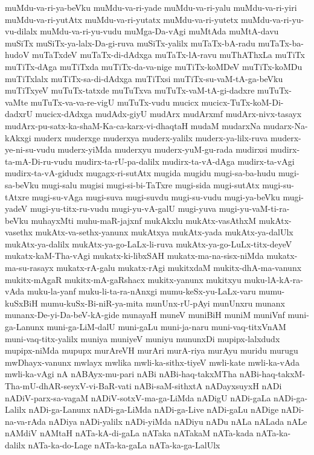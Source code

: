 {muMdu-va-ri-ya-beVku
muMdu-va-ri-yade
muMdu-va-ri-yalu
muMdu-va-ri-yiri
muMdu-va-ri-yutAtx
muMdu-va-ri-yutatx
muMdu-va-ri-yutetx
muMdu-va-ri-yu-vu-dilalx
muMdu-va-ri-yu-vudu
muMga-Da-vAgi
muMtAda
muMtA-davu
muSiTx
muSiTx-ya-lalx-Da-gi-ruva
muSiTx-yalilx
muTaTx-bA-radu
muTaTx-ba-hudoV
muTaTxdeV
muTaTx-di-dAdxga
muTaTx-lA-ravu
muThAThxLa
muTiTx
muTiTx-dAga
muTiTxda
muTiTx-da-va-nige
muTiTx-koMDeV
muTiTx-koMDu
muTiTxlalx
muTiTx-sa-di-dAdxga
muTiTxsi
muTiTx-su-vaM-tA-ga-beVku
muTiTxyeV
muTuTx-tatxde
muTuTxva
muTuTx-vaM-tA-gi-dadxre
muTuTx-vaMte
muTuTx-va-va-re-vigU
muTuTx-vudu
mucicx
mucicx-TuTx-koM-Di-dadxrU
mucicx-dAdxga
mudAdx-giyU
mudArx
mudArxmf
mudArx-nivx-tasayx
mudArx-pu-satx-ka-shaM-Ka-ca-karx-vi-dhaqtaH
mudaM
mudarxNa
mudarx-Na-kAkxgi
muderx
muderxge
muderxya
muderx-yalilx
muderx-ya-lilx-ruva
muderx-ye-ni-su-vudu
muderx-yiMda
muderxyu
muderx-yuM-gu-rada
mudirxsi
mudirx-ta-mA-Di-ru-vudu
mudirx-ta-rU-pa-dalilx
mudirx-ta-vA-dAga
mudirx-ta-vAgi
mudirx-ta-vA-gidudx
mugagx-ri-sutAtx
mugida
mugidu
mugi-sa-ba-hudu
mugi-sa-beVku
mugi-salu
mugisi
mugi-si-bi-TaTxre
mugi-sida
mugi-sutAtx
mugi-su-tAtxre
mugi-su-vAga
mugi-suva
mugi-suvdu
mugi-su-vudu
mugi-ya-beVku
mugi-yadeV
mugi-yu-titx-ru-vudu
mugi-yu-vA-galU
mugi-yuva
mugi-yu-vaM-ti-ra-beVku
muhayxMti
muhu-maR-jajxnf
mukAkxlu
mukAtx-vasAthxM
mukAtx-vasethx
mukAtx-va-sethx-yanunx
mukAtxya
mukAtx-yada
mukAtx-ya-dalUlx
mukAtx-ya-dalilx
mukAtx-ya-go-LaLx-li-ruva
mukAtx-ya-go-LuLx-titx-deyeV
mukatx-kaM-Tha-vAgi
mukatx-ki-libxSAH
mukatx-ma-na-sisx-niMda
mukatx-ma-su-rasayx
mukatx-rA-galu
mukatx-rAgi
mukitxdaM
mukitx-dhA-ma-vanunx
mukitx-mAgaR
mukitx-mA-gaRshacx
mukitx-yanunx
mukitxyu
muku-lA-kA-ra-vAda
muku-la-yanf
muku-li-ta-ra-nAnxgi
mumu-keSx-yu-LaLx-varu
mumu-kuSxBiH
mumu-kuSx-Bi-niR-ya-mita
munUnx-rU-pAyi
munUnxru
munanx
munanx-De-yi-Da-beV-kA-gide
munayaH
muneV
muniBiH
muniM
muniVnf
muni-ga-Lanunx
muni-ga-LiM-dalU
muni-gaLu
muni-ja-naru
muni-vaq-titxVnAM
muni-vaq-titx-yalilx
muniya
muniyeV
muniyu
mununxDi
mupipx-lalxdudx
mupipx-niMda
mupupx
murAreVH
murAri
murA-riya
murAyu
muridu
murugu
mwDhayx-vanunx
mwlayx
mwlika
mwli-ka-sithx-tiyeV
mwli-kate
mwli-ka-vAda
mwli-ka-vAgi
nA
nABAyx-mu-pari
nABi
nABi-haq-takxMTha
nABi-haq-takxM-Tha-mU-dhAR-seyxV-vi-BaR-vati
nABi-saM-sithxtA
nADayxsuyxH
nADi
nADiV-parx-sa-vagaM
nADiV-sotxV-ma-ga-LiMda
nADigU
nADi-gaLa
nADi-ga-Lalilx
nADi-ga-Lanunx
nADi-ga-LiMda
nADi-ga-Live
nADi-gaLu
nADige
nADi-na-va-rAda
nADiya
nADi-yalilx
nADi-yiMda
nADiyu
nADu
nALa
nALada
nALe
nAMdiV
nAMtaH
nATa-kA-di-gaLa
nATaka
nATakaM
nATa-kada
nATa-ka-dalilx
nATa-ka-do-Lage
nATa-ka-gaLa
nATa-ka-ga-LalUlx
}
